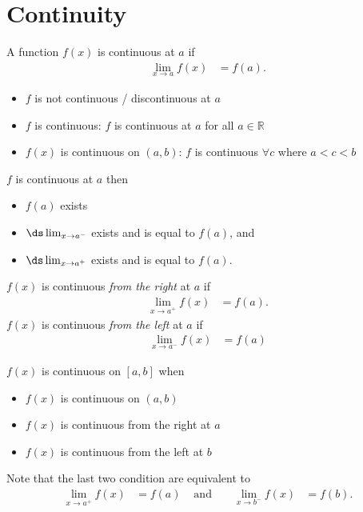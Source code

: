 \section{Continuity}\label{sec_1_6}
\begin{defn}\label{def_1_6_1}
A function $f(x)$ is continuous at $a$ if
\begin{align*}
\lim_{x \to a} f(x) &= f(a).
\end{align*}
\begin{itemize}
\item $f$ is not continuous / discontinuous at $a$
\item $f$ is continuous: $f$ is continuous at $a$ for all $a \in \mathbb{R}$
\item $f(x)$ is continuous on $(a,b)$: $f$ is continuous $\forall c$ where $a < c <b$
\end{itemize}
\end{defn}
$f$ is continuous at $a$ then
\begin{itemize}
\item $f(a)$ exists
\item $\ds \lim_{x \to a^-}$ exists and is equal to $f(a)$, and
\item $\ds \lim_{x \to a^+}$ exists and is equal to $f(a)$.
\end{itemize}
\begin{defn}\label{def_1_6_2}
$f(x)$ is continuous \emph{from the right} at $a$ if
\begin{align*}
\lim_{x\to a^+} f(x) &= f(a).
\end{align*}
$f(x)$ is continuous \emph{from the left} at $a$ if
\begin{align*}
\lim_{x\to a^-} f(x) &= f(a)
\end{align*}
\end{defn}
\begin{defn}\label{def_1_6_3}
$f(x)$ is continuous on $[a,b]$ when
\begin{itemize}
\item $f(x)$ is continuous on $(a,b)$
\item $f(x)$ is continuous from the right at $a$
\item $f(x)$ is continuous from the left at $b$
\end{itemize}
Note that the last two condition are equivalent to
\begin{align*}
\lim_{x\to a^+} f(x) &= f(a) & \text{ and } && \lim_{x\to b^-} f(x) &= f(b).
\end{align*}
\end{defn}
